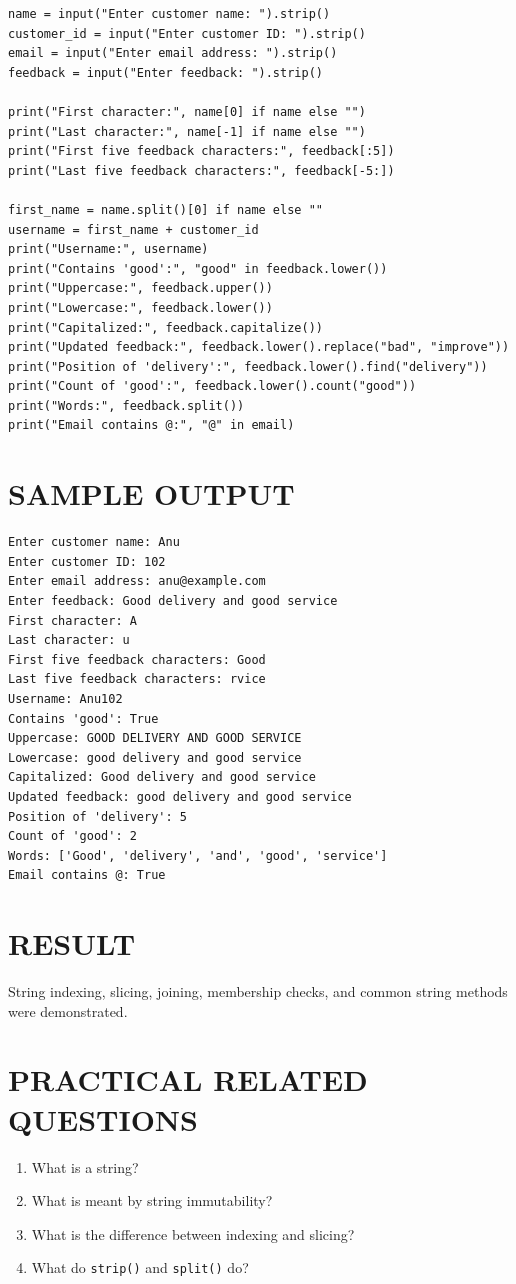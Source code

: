 \documentclass[12pt,a4paper]{report}
\newcommand{\result}[1]{\section*{RESULT}#1}
\newcommand{\questions}[1]{\section*{PRACTICAL RELATED QUESTIONS}#1}
\newcommand{\sampleoutput}{\section*{SAMPLE OUTPUT}}
\begin{document}
\begin{lstlisting}
name = input("Enter customer name: ").strip()
customer_id = input("Enter customer ID: ").strip()
email = input("Enter email address: ").strip()
feedback = input("Enter feedback: ").strip()

print("First character:", name[0] if name else "")
print("Last character:", name[-1] if name else "")
print("First five feedback characters:", feedback[:5])
print("Last five feedback characters:", feedback[-5:])

first_name = name.split()[0] if name else ""
username = first_name + customer_id
print("Username:", username)
print("Contains 'good':", "good" in feedback.lower())
print("Uppercase:", feedback.upper())
print("Lowercase:", feedback.lower())
print("Capitalized:", feedback.capitalize())
print("Updated feedback:", feedback.lower().replace("bad", "improve"))
print("Position of 'delivery':", feedback.lower().find("delivery"))
print("Count of 'good':", feedback.lower().count("good"))
print("Words:", feedback.split())
print("Email contains @:", "@" in email)
\end{lstlisting}

\sampleoutput
\begin{verbatim}
Enter customer name: Anu
Enter customer ID: 102
Enter email address: anu@example.com
Enter feedback: Good delivery and good service
First character: A
Last character: u
First five feedback characters: Good 
Last five feedback characters: rvice
Username: Anu102
Contains 'good': True
Uppercase: GOOD DELIVERY AND GOOD SERVICE
Lowercase: good delivery and good service
Capitalized: Good delivery and good service
Updated feedback: good delivery and good service
Position of 'delivery': 5
Count of 'good': 2
Words: ['Good', 'delivery', 'and', 'good', 'service']
Email contains @: True
\end{verbatim}

\result{String indexing, slicing, joining, membership checks, and common string methods were demonstrated.}

\questions{
\begin{enumerate}
\item What is a string?
\item What is meant by string immutability?
\item What is the difference between indexing and slicing?
\item What do \texttt{strip()} and \texttt{split()} do?
\end{enumerate}}
\end{document}
